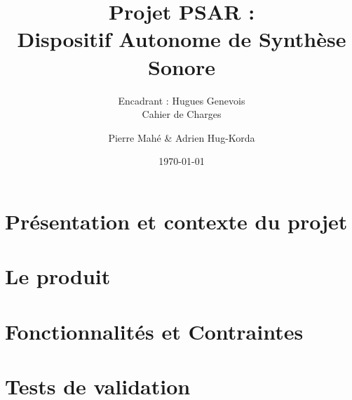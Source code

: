 \documentclass[a4paper, titlepage, oneside, 12pt]{article}%
\title{Projet PSAR :\\ Dispositif Autonome de Synthèse Sonore}
\subtitle{Encadrant : Hugues Genevois \\ Cahier de Charges}
\author{Pierre Mahé \& Adrien Hug-Korda}
\date{\today}
\begin{document}
 
\maketitle 
\tableofcontents

\newpage

\section{Présentation et contexte du projet}

\section{Le produit}

\section{Fonctionnalités et Contraintes}

\section{Tests de validation}

 
\end{document}
